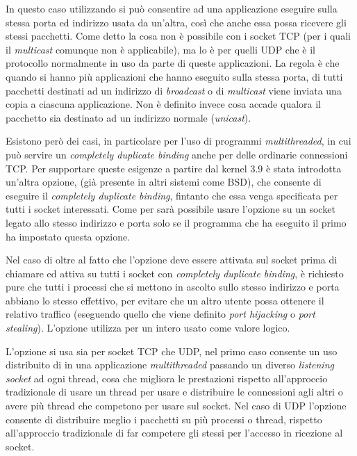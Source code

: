 In questo caso utilizzando  si può consentire ad una
applicazione eseguire  sulla stessa porta ed indirizzo usata da
un'altra, così che anche essa possa ricevere gli stessi pacchetti. Come detto
la cosa non è possibile con i socket TCP (per i quali il \textit{multicast}
comunque non è applicabile), ma lo è per quelli UDP che è il protocollo
normalmente in uso da parte di queste applicazioni. La regola è che quando si
hanno più applicazioni che hanno eseguito  sulla stessa porta, di
tutti pacchetti destinati ad un indirizzo di \textit{broadcast} o di
\textit{multicast} viene inviata una copia a ciascuna applicazione. Non è
definito invece cosa accade qualora il pacchetto sia destinato ad un indirizzo
normale (\textit{unicast}).



Esistono però dei casi, in particolare per l'uso di programmi
\textit{multithreaded}, in cui può servire un \textit{completely duplicate
  binding} anche per delle ordinarie connessioni TCP.  Per supportare queste
esigenze a partire dal kernel 3.9 è stata introdotta un'altra opzione,
 (già presente in altri sistemi come BSD), che consente
di eseguire il \textit{completely duplicate binding}, fintanto che essa venga
specificata per tutti i socket interessati. Come per 
sarà possibile usare l'opzione su un socket legato allo stesso indirizzo e
porta solo se il programma che ha eseguito il primo  ha impostato
questa opzione.

Nel caso di  oltre al fatto che l'opzione deve essere
attivata sul socket prima di chiamare  ed attiva su tutti i socket
con \textit{completely duplicate binding}, è richiesto pure che tutti i
processi che si mettono in ascolto sullo stesso indirizzo e porta abbiano lo
stesso  effettivo, per evitare che un altro utente possa ottenere il
relativo traffico (eseguendo quello che viene definito \textit{port hijacking}
o \textit{port stealing}). L'opzione utilizza per  un intero
usato come valore logico.

L'opzione si usa sia per socket TCP che UDP, nel primo caso consente un uso
distribuito di  in una applicazione \textit{multithreaded}
passando un diverso \textit{listening socket} ad ogni thread, cosa che
migliora le prestazioni rispetto all'approccio tradizionale di usare un thread
per usare  e distribuire le connessioni agli altri o avere più
thread che competono per usare  sul socket. Nel caso di UDP
l'opzione consente di distribuire meglio i pacchetti su più processi o thread,
rispetto all'approccio tradizionale di far competere gli stessi per l'accesso
in ricezione al socket.

